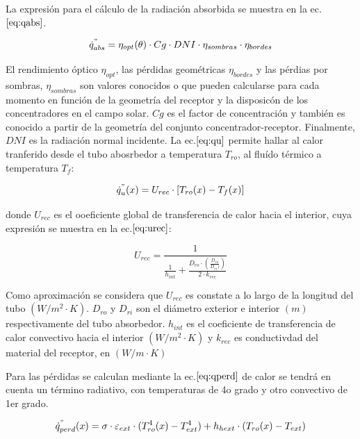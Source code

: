 \documentclass[11pt]{article}
\begin{document}
La expresión para el cálculo de la radiación absorbida se muestra en la
ec.\(\eqref{eq:qabs}\).

\begin{equation}
    \dot{q}^{"}_{abs}= \eta_{opt}(\theta) \cdot Cg \cdot DNI \cdot \eta_{sombras} \cdot \eta_{bordes} \label{eq:qabs}
\end{equation}

El rendimiento óptico \(\eta_{opt}\), las pérdidas geométricas
\(\eta_{bordes}\) y las pérdias por sombras, \(\eta_{sombras}\) son
valores conocidos o que pueden calcularse para cada momento en función
de la geometría del receptor y la disposicón de los concentradores en el
campo solar. \(Cg\) es el factor de concentración y también es conocido
a partir de la geometría del conjunto concentrador-receptor. Finalmente,
\(DNI\) es la radiación normal incidente. La ec.\(\eqref{eq:qu}\)
permite hallar al calor tranferido desde el tubo abosrbedor a
temperatura \(T_{ro}\), al fluído térmico a temperatura \(T_{f}\):

\begin{equation}
    \dot{q}^{"}_{u}(x)= U_{rec} \cdot [T_{ro}(x)-T_{f}(x)] \label{eq:qu}
\end{equation}

donde \(U_{rec}\) es el ooeficiente global de transferencia de calor
hacia el interior, cuya expresión se muestra en la
ec.\(\eqref{eq:urec}\):

\begin{equation}
    U_{rec} = \frac{1}{\frac{1}{h_{int}} + \frac{D_{ro}\cdot(\frac{D_{ro}}{D_{ri})})}{2\cdot k_{rec}}} \label{eq:urec}
\end{equation}

Como aproximación se considera que \(U_{rec}\) es constate a lo largo de
la longitud del tubo \((W/m^{2}\cdot K)\). \(D_{ro}\) y \(D_{ri}\) son
el diámetro exterior e interior \((m)\) respectivamente del tubo
absorbedor. \(h_{int}\) es el coeficiente de transferencia de calor
convectivo hacia el interior \((W/m^{2}\cdot K)\) y \(k_{rec}\) es
conductivdad del material del receptor, en \((W/m\cdot K)\)

Para las pérdidas se calculan mediante la ec.\(\eqref{eq:qperd}\) de
calor se tendrá en cuenta un término radiativo, con temperaturas de 4o
grado y otro convectivo de 1er grado.

\begin{equation}
    \dot{q}^{"}_{perd}(x)= \sigma \cdot \varepsilon_{ext} \cdot (T_{ro}^{4}(x)-T_{ext}^{4}) + h_{hext} \cdot (T_{ro}(x)-T_{ext}) \label{eq:qperd}
\end{equation}
\end{document}

